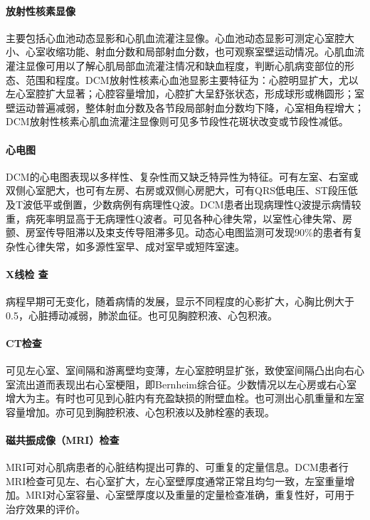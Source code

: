 \paragraph{放射性核素显像}

主要包括心血池动态显影和心肌血流灌注显像。心血池动态显影可测定心室腔大小、心室收缩功能、射血分数和局部射血分数，也可观察室壁运动情况。心肌血流灌注显像可用以了解心肌局部血流灌注情况和缺血程度，判断心肌病变部位的形态、范围和程度。DCM放射性核素心血池显影主要特征为：心腔明显扩大，尤以左心室腔扩大显著；心腔容量增加，心腔扩大呈舒张状态，形成球形或椭圆形；室壁运动普遍减弱，整体射血分数及各节段局部射血分数均下降，心室相角程增大；DCM放射性核素心肌血流灌注显像则可见多节段性花斑状改变或节段性减低。

\paragraph{心电图}

DCM的心电图表现以多样性、复杂性而又缺乏特异性为特征。可有左室、右室或双侧心室肥大，也可有左房、右房或双侧心房肥大，可有QRS低电压、ST段压低及T波低平或倒置，少数病例有病理性Q波。DCM患者出现病理性Q波提示病情较重，病死率明显高于无病理性Q波者。可见各种心律失常，以室性心律失常、房颤、房室传导阻滞以及束支传导阻滞多见。动态心电图监测可发现90\%的患者有复杂性心律失常，如多源性室早、成对室早或短阵室速。

\paragraph{X线检 查}

病程早期可无变化，随着病情的发展，显示不同程度的心影扩大，心胸比例大于0.5，心脏搏动减弱，肺淤血征。也可见胸腔积液、心包积液。

\paragraph{CT检查}

可见左心室、室间隔和游离壁均变薄，左心室腔明显扩张，致使室间隔凸出向右心室流出道而表现出右心室梗阻，即Bernheim综合征。少数情况以左心房或右心室增大为主。有时也可见到心脏内有充盈缺损的附壁血栓。也可测出心肌重量和左室容量增加。亦可见到胸腔积液、心包积液以及肺栓塞的表现。

\paragraph{磁共振成像（MRI）检查}

MRI可对心肌病患者的心脏结构提出可靠的、可重复的定量信息。DCM患者行MRI检查可见左、右心室扩大，左心室壁厚度通常正常且均匀一致，左室重量增加。MRI对心室容量、心室壁厚度以及重量的定量检查准确，重复性好，可用于治疗效果的评价。

